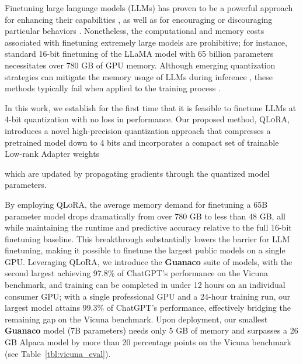 Finetuning large language models (LLMs) has proven to be a powerful approach for enhancing their capabilities \citep{min2021metaicl, wei2021finetuned, ouyang2022training, wang2022super, wang2022self, liu2022few}, as well as for encouraging or discouraging particular behaviors \citep{ouyang2022training,askell2021general,bai2022training}. Nonetheless, the computational and memory costs associated with finetuning extremely large models are prohibitive; for instance, standard 16-bit finetuning of the LLaMA model with 65 billion parameters~\citep{touvron2023llama} necessitates over 780 GB of GPU memory. Although emerging quantization strategies can mitigate the memory usage of LLMs during inference \citep{dettmers2022llm, dettmers2022case, frantar2022gptq, xiao2022smoothquant}, these methods typically fail when applied to the training process \citep{wortsman2023stable}.

In this work, we establish for the first time that it is feasible to finetune LLMs at 4-bit quantization with no loss in performance. Our proposed method, \textsc{QLoRA}, introduces a novel high-precision quantization approach that compresses a pretrained model down to 4 bits and incorporates a compact set of trainable Low-rank Adapter weights \citep{hu2021lora} 

which are updated by propagating gradients through the quantized model parameters.

By employing \textsc{QLoRA}, the average memory demand for finetuning a 65B parameter model drops dramatically from over 780 GB to less than 48 GB, all while maintaining the runtime and predictive accuracy relative to the full 16-bit finetuning baseline. This breakthrough substantially lowers the barrier for LLM finetuning, making it possible to finetune the largest public models on a single GPU. Leveraging \textsc{QLoRA}, we introduce the \textbf{Guanaco} suite of models, with the second largest achieving 97.8\% of ChatGPT's performance on the Vicuna~\citep{vicuna2023} benchmark, and training can be completed in under 12 hours on an individual consumer GPU; with a single professional GPU and a 24-hour training run, our largest model attains 99.3\% of ChatGPT's performance, effectively bridging the remaining gap on the Vicuna benchmark. Upon deployment, our smallest \textbf{Guanaco} model (7B parameters) needs only 5 GB of memory and surpasses a 26 GB Alpaca model by more than 20 percentage points on the Vicuna benchmark (see Table~\ref{tbl:vicuna_eval}).

